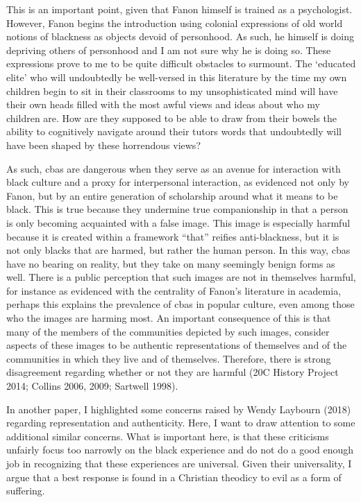 \documentclass[
  letterpaper,
  DIV=11,
  numbers=noendperiod]{scrreprt}
\begin{document}
\begin{tcolorbox}[enhanced jigsaw, arc=.35mm, breakable, rightrule=.15mm, colback=white, colframe=quarto-callout-important-color-frame, bottomrule=.15mm, leftrule=.75mm, opacityback=0, toprule=.15mm, left=2mm]
\begin{tcolorbox}[enhanced jigsaw, arc=.35mm, breakable, rightrule=.15mm, colback=white, colframe=quarto-callout-tip-color-frame, bottomrule=.15mm, leftrule=.75mm, opacityback=0, toprule=.15mm, left=2mm]
This is an important point, given that Fanon himself is trained as a
psychologist. However, Fanon begins the introduction using colonial
expressions of old world notions of blackness as objects devoid of
personhood. As such, he himself is doing depriving others of personhood
and I am not sure why he is doing so. These expressions prove to me to
be quite difficult obstacles to surmount. The `educated elite' who will
undoubtedly be well-versed in this literature by the time my own
children begin to sit in their classrooms to my unsophisticated mind
will have their own heads filled with the most awful views and ideas
about who my children are. How are they supposed to be able to draw from
their bowels the ability to cognitively navigate around their tutors
words that undoubtedly will have been shaped by these horrendous views?

As such, cbas are dangerous when they serve as an avenue for interaction
with black culture and a proxy for interpersonal interaction, as
evidenced not only by Fanon, but by an entire generation of scholarship
around what it means to be black. This is true because they undermine
true companionship in that a person is only becoming acquainted with a
false image. This image is especially harmful because it is created
within a framework ``that'' reifies anti-blackness, but it is not only
blacks that are harmed, but rather the human person. In this way, cbas
have no bearing on reality, but they take on many seemingly benign forms
as well. There is a public perception that such images are not in
themselves harmful, for instance as evidenced with the centrality of
Fanon's literature in academia, perhaps this explains the prevalence of
cbas in popular culture, even among those who the images are harming
most. An important consequence of this is that many of the members of
the communities depicted by such images, consider aspects of these
images to be authentic representations of themselves and of the
communities in which they live and of themselves. Therefore, there is
strong disagreement regarding whether or not they are harmful (20C
History Project 2014; Collins 2006, 2009; Sartwell 1998).

In another paper, I highlighted some concerns raised by Wendy Laybourn
(2018) regarding representation and authenticity. Here, I want to draw
attention to some additional similar concerns. What is important here,
is that these criticisms unfairly focus too narrowly on the black
experience and do not do a good enough job in recognizing that these
experiences are universal. Given their universality, I argue that a best
response is found in a Christian theodicy to evil as a form of
suffering.


\end{tcolorbox}
\end{tcolorbox}
\end{document}
